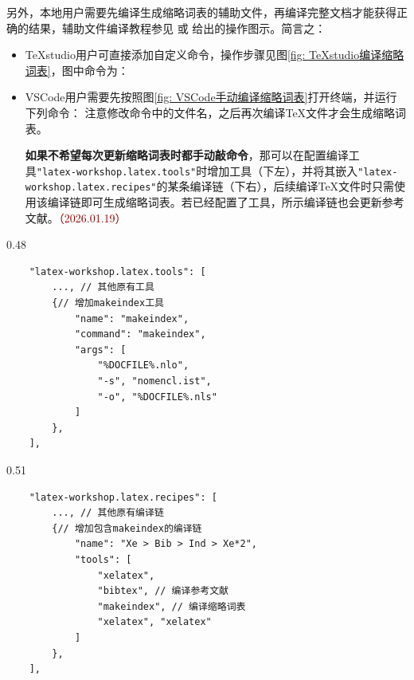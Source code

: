 	另外，本地用户需要先编译生成缩略词表的辅助文件，再编译完整文档才能获得正确的结果，辅助文件编译教程参见\href{https://zhuanlan.zhihu.com/p/46442713}{\color{DarkRed}} 或 \href{https://github.com/MGG1996/DissertationUESTC?tab=readme-ov-file#6-目录图目录表目录主要符号表缩略词表}{\color{DarkRed}}给出的操作图示。简言之：
	\begin{itemize}
		\item TeXstudio用户可直接添加自定义命令，操作步骤见图\ref{fig: TeXstudio编译缩略词表}，图中命令为：\newline
		\item VSCode用户需要先按照图\ref{fig: VSCode手动编译缩略词表}打开终端，并运行下列命令：\newline
		\newline
		注意修改命令中的文件名，之后再次编译TeX文件才会生成缩略词表。
		
		\textbf{\color{DarkRed}如果不希望每次更新缩略词表时都手动敲命令}，那可以在配置编译工具\verb*|"latex-workshop.latex.tools"|时增加工具（下左），并将其嵌入\verb*|"latex-workshop.latex.recipes"|的某条编译链（下右），后续编译TeX文件时只需使用该编译链即可生成缩略词表。若已经配置了工具，所示编译链也会更新参考文献。\textcolor{DarkRed}{（2026.01.19）}
	\end{itemize}
	\begin{boxedminipage}[t]{0.48\linewidth}
		\vspace*{5pt}%
		\begin{verbatim}
	"latex-workshop.latex.tools": [
		..., // 其他原有工具
		{// 增加makeindex工具
			"name": "makeindex",
			"command": "makeindex",
			"args": [
				"%DOCFILE%.nlo",
				"-s", "nomencl.ist",
				"-o", "%DOCFILE%.nls"
			]
		},
	],
		\end{verbatim}
	\end{boxedminipage}
	\begin{boxedminipage}[t]{0.51\linewidth}
		\vspace*{5pt}
		\begin{verbatim}
	"latex-workshop.latex.recipes": [
		..., // 其他原有编译链
		{// 增加包含makeindex的编译链
			"name": "Xe > Bib > Ind > Xe*2",
			"tools": [
				"xelatex",
				"bibtex", // 编译参考文献
				"makeindex", // 编译缩略词表
				"xelatex", "xelatex"
			]
		},
	],
		\end{verbatim}
	\end{boxedminipage}
	